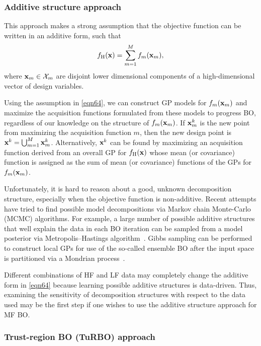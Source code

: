\documentclass[iicol,sn-basic]{sn-jnl}%
\begin{document}
\subsubsection{Additive structure approach}\label{Sec622}

This approach makes a strong assumption that the objective function can be written in an additive form, such that~\citep{Kandasamy2015}
\begin{equation}\label{eqn64}
	f_\text{H}({\bf x}) = \sum_{m=1}^{M}f_m({\bf x}_m), 
\end{equation}
where ${\bf x}_m \in \mathcal{X}_m$ are disjoint lower dimensional components of a high-dimensional vector of design variables.

Using the assumption in \cref{eqn64}, we can construct GP models for $f_m({\bf x}_m)$ and maximize the acquisition functions formulated from these models to progress BO, regardless of our knowledge on the structure of $f_m({\bf x}_m)$.
If ${\bf x}^k_m$ is the new point from maximizing the acquisition function $m$, then the new design point is ${\bf x}^k = \bigcup_{m=1}^M {\bf x}^k_m$.
Alternatively, ${\bf x}^k$ can be found by maximizing an acquisition function derived from an overall GP for $f_\text{H}({\bf x})$ whose mean (or covariance) function is assigned as the sum of mean (or covariance) functions of the GPs for $f_m({\bf x}_m)$. 

Unfortunately, it is hard to reason about a good, unknown decomposition structure, especially when the objective function is non-additive. 
Recent attempts have tried to find possible model decompositions via Markov chain Monte-Carlo (MCMC) algorithms.
For example, a large number of possible additive structures that well explain the data in each BO iteration can be sampled from a model posterior via Metropolis–Hastings algorithm~\citep{Gardner2017}. 
Gibbs sampling can be performed to construct local GPs for use of the so-called ensemble BO after the input space is partitioned via a Mondrian process~\citep{WangZ2018}.

Different combinations of HF and LF data may completely change the additive form in \cref{eqn64} because learning possible additive structures is data-driven.
Thus, examining the sensitivity of decomposition structures with respect to the data used may be the first step if one wishes to use the additive structure approach for MF BO.

\subsubsection{Trust-region BO (TuRBO) approach}\label{Sec623}
\end{document}
